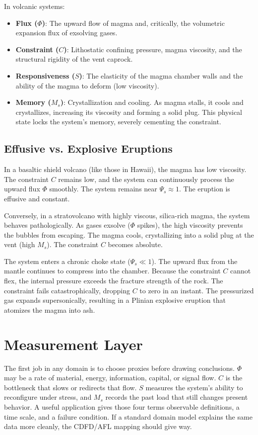 \documentclass[11pt,a4paper]{article}
\begin{document}
In volcanic systems:
\begin{itemize}
    \item \textbf{Flux ($\Phi$)}: The upward flow of magma and, critically, the volumetric expansion flux of exsolving gases.
    \item \textbf{Constraint ($C$)}: Lithostatic confining pressure, magma viscosity, and the structural rigidity of the vent caprock.
    \item \textbf{Responsiveness ($S$)}: The elasticity of the magma chamber walls and the ability of the magma to deform (low viscosity).
    \item \textbf{Memory ($M_s$)}: Crystallization and cooling. As magma stalls, it cools and crystallizes, increasing its viscosity and forming a solid plug. This physical state locks the system's memory, severely cementing the constraint.
\end{itemize}

\subsection{Effusive vs. Explosive Eruptions}
In a basaltic shield volcano (like those in Hawaii), the magma has low viscosity. The constraint $C$ remains low, and the system can continuously process the upward flux $\Phi$ smoothly. The system remains near $\Psi_s \approx 1$. The eruption is effusive and constant.

Conversely, in a stratovolcano with highly viscous, silica-rich magma, the system behaves pathologically. As gases exsolve ($\Phi$ spikes), the high viscosity prevents the bubbles from escaping. The magma cools, crystallizing into a solid plug at the vent (high $M_s$). The constraint $C$ becomes absolute.

The system enters a chronic choke state ($\Psi_s \ll 1$). The upward flux from the mantle continues to compress into the chamber. Because the constraint $C$ cannot flex, the internal pressure exceeds the fracture strength of the rock. The constraint fails catastrophically, dropping $C$ to zero in an instant. The pressurized gas expands supersonically, resulting in a Plinian explosive eruption that atomizes the magma into ash.



\section{Measurement Layer}

The first job in any domain is to choose proxies before drawing conclusions. $\Phi$ may be a rate of material, energy, information, capital, or signal flow. $C$ is the bottleneck that slows or redirects that flow. $S$ measures the system's ability to reconfigure under stress, and $M_s$ records the past load that still changes present behavior. A useful application gives those four terms observable definitions, a time scale, and a failure condition. If a standard domain model explains the same data more cleanly, the CDFD/AFL mapping should give way.
\end{document}

